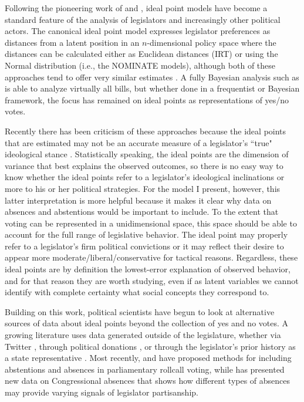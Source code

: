 	Following the pioneering work of \textcite{poole1997} and \textcite{jackman2004}, ideal point models have become a standard feature of the analysis of legislators and increasingly other political actors. The canonical ideal point model expresses legislator preferences as distances from a latent position in an $n$-dimensional policy space \parencite{enelow198} where the distances can be calculated either as Euclidean distances (IRT) or using the Normal distribution (i.e., the NOMINATE models), although both of these approaches tend to offer very similar estimates  \parencite{carroll2009}. A fully Bayesian analysis such as \textcite{jackman2004} is able to analyze virtually all bills, but whether done in a frequentist or Bayesian framework, the focus has remained on ideal points as representations of yes/no votes.
	
	Recently there has been criticism of these approaches because the ideal points that are estimated may not be an accurate measure of a legislator's ``true" ideological stance \parencite{krehbiel2014,Caughey2016,brauninger2016}. Statistically speaking, the ideal points are the dimension of variance that best explains the observed outcomes, so there is no easy way to know whether the ideal points refer to a legislator's ideological inclinations or more to his or her political strategies. For the model I present, however, this latter interpretation is more helpful because it makes it clear why data on absences and abstentions would be important to include. To the extent that voting can be represented in a unidimensional space, this space should be able to account for the full range of legislative behavior. The ideal point may properly refer to a legislator's firm political convictions or it may reflect their desire to appear more moderate/liberal/conservative for tactical reasons. Regardless, these ideal points are by definition the lowest-error explanation of observed behavior, and for that reason they are worth studying, even if as latent variables we cannot identify with complete certainty what social concepts they correspond to.
	
	Building on this work, political scientists have begun to look at alternative sources of data about ideal points beyond the collection of yes and no votes. A growing literature uses data generated outside of the legislature, whether via Twitter \parencite{barbera2015}, through political donations \parencite{bonica2014}, or through the legislator's prior history as a state representative \parencite{shor2011}. Most recently, \textcite{brauninger2016} and \textcite{rosas2015} have proposed methods for including abstentions and absences in parliamentary rollcall voting, while \textcite{powell2016} has presented new data on Congressional absences that shows how different types of absences may provide varying signals of legislator partisanship.
	
